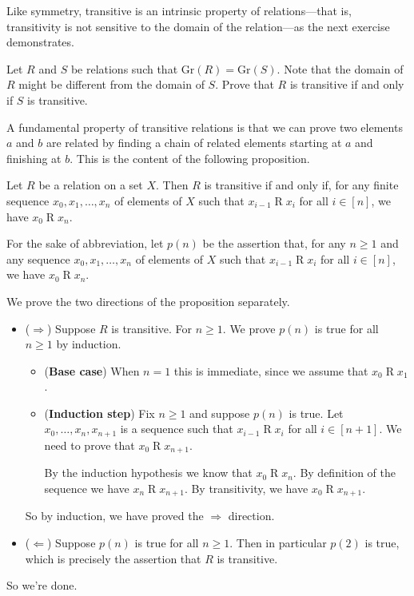 Like symmetry, transitive is an intrinsic property of relations---that is, transitivity is not sensitive to the domain of the relation---as the next exercise demonstrates.

\begin{exercise}
\label{exTransitivityNotSensitiveToDomainOfRelation}
Let $R$ and $S$ be relations such that $\mathrm{Gr}(R) = \mathrm{Gr}(S)$. Note that the domain of $R$ might be different from the domain of $S$. Prove that $R$ is transitive if and only if $S$ is transitive.
\end{exercise}

A fundamental property of transitive relations is that we can prove two elements $a$ and $b$ are related by finding a chain of related elements starting at $a$ and finishing at $b$. This is the content of the following proposition.

\begin{proposition}
\label{propTransitiveChain}
Let $R$ be a relation on a set $X$. Then $R$ is transitive if and only if, for any finite sequence $x_0, x_1, \dots, x_n$ of elements of $X$ such that $x_{i-1} \mathrel{R} x_i$ for all $i \in [n]$, we have $x_0 \mathrel{R} x_n$.
\end{proposition}
\begin{cproof}
For the sake of abbreviation, let $p(n)$ be the assertion that, for any $n \ge 1$ and any sequence $x_0, x_1, \dots, x_n$ of elements of $X$ such that $x_{i-1} \mathrel{R} x_i$ for all $i \in [n]$, we have $x_0 \mathrel{R} x_n$.

We prove the two directions of the proposition separately.
\begin{itemize}
\item ($\Rightarrow$) Suppose $R$ is transitive. For $n \ge 1$. We prove $p(n)$ is true for all $n \ge 1$ by induction.
\begin{itemize}
\item (\textbf{Base case}) When $n=1$ this is immediate, since we assume that $x_0 \mathrel{R} x_1$.
\item (\textbf{Induction step}) Fix $n \ge 1$ and suppose $p(n)$ is true. Let $x_0, \dots, x_n, x_{n+1}$ is a sequence such that $x_{i-1} \mathrel{R} x_i$ for all $i \in [n+1]$. We need to prove that $x_0 \mathrel{R} x_{n+1}$.

By the induction hypothesis we know that $x_0 \mathrel{R} x_n$. By definition of the sequence we have $x_n \mathrel{R} x_{n+1}$. By transitivity, we have $x_0 \mathrel{R} x_{n+1}$.
\end{itemize}
So by induction, we have proved the $\Rightarrow$ direction.
\item ($\Leftarrow$)
Suppose $p(n)$ is true for all $n \ge 1$. Then in particular $p(2)$ is true, which is precisely the assertion that $R$ is transitive.
\end{itemize}
So we're done.
\end{cproof}

